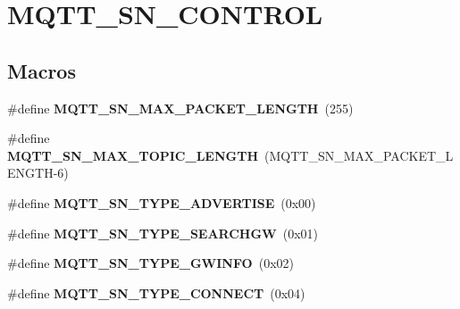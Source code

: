\hypertarget{group__MQTT__SN__CONTROL}{\section{M\+Q\+T\+T\+\_\+\+S\+N\+\_\+\+C\+O\+N\+T\+R\+O\+L}
\label{group__MQTT__SN__CONTROL}
}
\subsection*{Macros}
\begin{DoxyCompactItemize}
\item 
\hypertarget{group__MQTT__SN__CONTROL_gac6620fe642df6fedae5da980e3cc1685}{\#define {\bfseries M\+Q\+T\+T\+\_\+\+S\+N\+\_\+\+M\+A\+X\+\_\+\+P\+A\+C\+K\+E\+T\+\_\+\+L\+E\+N\+G\+T\+H}~(255)}\label{group__MQTT__SN__CONTROL_gac6620fe642df6fedae5da980e3cc1685}

\item 
\hypertarget{group__MQTT__SN__CONTROL_ga3dccee9ebffc9265d5c3cd3107ca601b}{\#define {\bfseries M\+Q\+T\+T\+\_\+\+S\+N\+\_\+\+M\+A\+X\+\_\+\+T\+O\+P\+I\+C\+\_\+\+L\+E\+N\+G\+T\+H}~(M\+Q\+T\+T\+\_\+\+S\+N\+\_\+\+M\+A\+X\+\_\+\+P\+A\+C\+K\+E\+T\+\_\+\+L\+E\+N\+G\+T\+H-\/6)}\label{group__MQTT__SN__CONTROL_ga3dccee9ebffc9265d5c3cd3107ca601b}

\item 
\hypertarget{group__MQTT__SN__CONTROL_ga064185df38354c8d31cba8f173a8b39f}{\#define {\bfseries M\+Q\+T\+T\+\_\+\+S\+N\+\_\+\+T\+Y\+P\+E\+\_\+\+A\+D\+V\+E\+R\+T\+I\+S\+E}~(0x00)}\label{group__MQTT__SN__CONTROL_ga064185df38354c8d31cba8f173a8b39f}

\item 
\hypertarget{group__MQTT__SN__CONTROL_ga8170ee7211bec9249606010e8af4765d}{\#define {\bfseries M\+Q\+T\+T\+\_\+\+S\+N\+\_\+\+T\+Y\+P\+E\+\_\+\+S\+E\+A\+R\+C\+H\+G\+W}~(0x01)}\label{group__MQTT__SN__CONTROL_ga8170ee7211bec9249606010e8af4765d}

\item 
\hypertarget{group__MQTT__SN__CONTROL_ga5be35929c3e372b4a2fed0e133be0e92}{\#define {\bfseries M\+Q\+T\+T\+\_\+\+S\+N\+\_\+\+T\+Y\+P\+E\+\_\+\+G\+W\+I\+N\+F\+O}~(0x02)}\label{group__MQTT__SN__CONTROL_ga5be35929c3e372b4a2fed0e133be0e92}

\item 
\hypertarget{group__MQTT__SN__CONTROL_ga0ad512804838d2ba709e82ffb010d991}{\#define {\bfseries M\+Q\+T\+T\+\_\+\+S\+N\+\_\+\+T\+Y\+P\+E\+\_\+\+C\+O\+N\+N\+E\+C\+T}~(0x04)}\label{group__MQTT__SN__CONTROL_ga0ad512804838d2ba709e82ffb010d991}


\end{DoxyCompactItemize}
